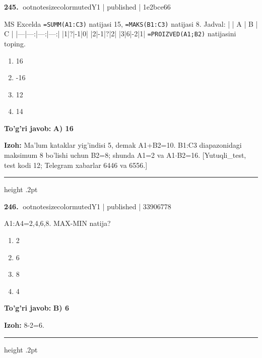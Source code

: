 \documentclass[10pt,a4paper]{article}
\begin{document}
\textbf{\color{ink}245.} {ootnotesizecolor{muted}Y1 | published | 1e2bce66}
\par
MS Excelda \texttt{=SUMM(A1:C3)} natijasi 15, \texttt{=MAKS(B1:C3)} natijasi 8. Jadval: \newline  \newline |   | A | B | C | \newline |---|---:|---:|---:| \newline |1|?|-1|0| \newline |2|-1|?|2| \newline |3|6|-2|1| \newline  \newline \texttt{=PROIZVED(A1;B2)} natijasini toping.
\begin{enumerate}[label=\Alph*),leftmargin=9mm]
\item 16
\item -16
\item 12
\item 14
\end{enumerate}
\begin{tcolorbox}[enhanced,breakable,colback=teal!4,colframe=teal!55!black,boxrule=0.45pt,arc=1.2mm,left=2.8mm,right=2.8mm,top=2mm,bottom=2mm]
\textbf{\color{teal}To'g'ri javob:} \textbf{A) 16}
\par\smallskip
\textbf{Izoh:} Ma'lum kataklar yig'indisi 5, demak A1+B2=10. B1:C3 diapazonidagi maksimum 8 bo'lishi uchun B2=8; shunda A1=2 va A1\ensuremath{\cdot}B2=16. [Yutuqli\_test, test kodi 12; Telegram xabarlar 6446 va 6556.]
\end{tcolorbox}
\vspace{2mm}\hrule height .2pt\vspace{2mm}

\textbf{\color{ink}246.} {ootnotesizecolor{muted}Y1 | published | 33906778}
\par
A1:A4=2,4,6,8. MAX-MIN natija?
\begin{enumerate}[label=\Alph*),leftmargin=9mm]
\item 2
\item 6
\item 8
\item 4
\end{enumerate}
\begin{tcolorbox}[enhanced,breakable,colback=teal!4,colframe=teal!55!black,boxrule=0.45pt,arc=1.2mm,left=2.8mm,right=2.8mm,top=2mm,bottom=2mm]
\textbf{\color{teal}To'g'ri javob:} \textbf{B) 6}
\par\smallskip
\textbf{Izoh:} 8-2=6.
\end{tcolorbox}
\vspace{2mm}\hrule height .2pt\vspace{2mm}
\end{document}
